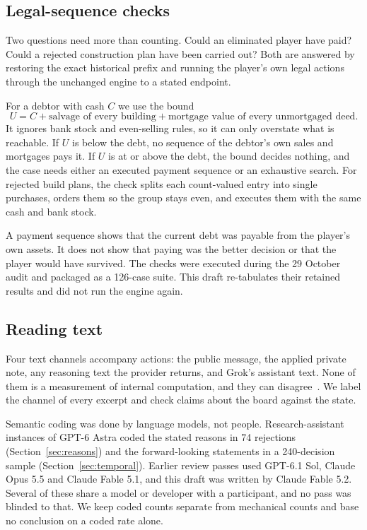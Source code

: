 \subsection{Legal-sequence checks}

Two questions need more than counting. Could an eliminated player have paid? Could a rejected construction plan have been carried out? Both are answered by restoring the exact historical prefix and running the player's own legal actions through the unchanged engine to a stated endpoint.

For a debtor with cash $C$ we use the bound
\begin{equation}
U = C + \text{salvage of every building} + \text{mortgage value of every unmortgaged deed}.
\label{eq:bound}
\end{equation}
It ignores bank stock and even-selling rules, so it can only overstate what is reachable. If $U$ is below the debt, no sequence of the debtor's own sales and mortgages pays it. If $U$ is at or above the debt, the bound decides nothing, and the case needs either an executed payment sequence or an exhaustive search. For rejected build plans, the check splits each count-valued entry into single purchases, orders them so the group stays even, and executes them with the same cash and bank stock.

A payment sequence shows that the current debt was payable from the player's own assets. It does not show that paying was the better decision or that the player would have survived. The checks were executed during the 29 October audit and packaged as a 126-case suite. This draft re-tabulates their retained results and did not run the engine again.

\subsection{Reading text}

Four text channels accompany actions: the public message, the applied private note, any reasoning text the provider returns, and Grok's assistant text. None of them is a measurement of internal computation, and they can disagree~\cite{turpin2023unfaithful,lanham2023faithfulness}. We label the channel of every excerpt and check claims about the board against the state.

Semantic coding was done by language models, not people. Research-assistant instances of GPT-6 Astra coded the stated reasons in 74 rejections (Section~\ref{sec:reasons}) and the forward-looking statements in a 240-decision sample (Section~\ref{sec:temporal}). Earlier review passes used GPT-6.1 Sol, Claude Opus 5.5 and Claude Fable 5.1, and this draft was written by Claude Fable 5.2. Several of these share a model or developer with a participant, and no pass was blinded to that. We keep coded counts separate from mechanical counts and base no conclusion on a coded rate alone.

